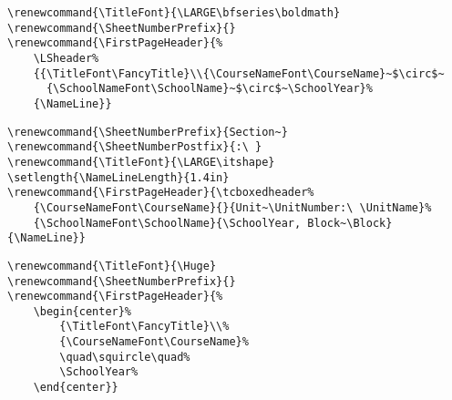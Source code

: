 \documentclass[12pt,twoside,parskip,notitle]{handout}
\begin{document}
\begingroup
\renewcommand{\TitleFont}{\LARGE\bfseries\boldmath}
\renewcommand{\SheetNumberPrefix}{}
\renewcommand{\FirstPageHeader}{%
	\LSheader%
	{{\TitleFont\FancyTitle}\\{\CourseNameFont\CourseName}~$\circ$~{\SchoolNameFont\SchoolName}~$\circ$~\SchoolYear}%
	{\NameLine}}
\maketitle
\singlespacing
\begin{verbatim}
\renewcommand{\TitleFont}{\LARGE\bfseries\boldmath}
\renewcommand{\SheetNumberPrefix}{}
\renewcommand{\FirstPageHeader}{%
    \LSheader%
    {{\TitleFont\FancyTitle}\\{\CourseNameFont\CourseName}~$\circ$~
      {\SchoolNameFont\SchoolName}~$\circ$~\SchoolYear}%
    {\NameLine}}
\end{verbatim}
\endgroup
\newpage

\begingroup
\renewcommand{\SheetNumberPrefix}{Section~}
\renewcommand{\SheetNumberPostfix}{:\ }
\renewcommand{\TitleFont}{\LARGE\itshape}
\setlength{\NameLineLength}{1.4in}
\renewcommand{\FirstPageHeader}{\tcboxedheader{\CourseNameFont\CourseName}{}{Unit~\UnitNumber:\ \UnitName}{\SchoolNameFont\SchoolName}{\SchoolYear, Block~\Block}{\NameSpace}}
\maketitle
\singlespacing
\begin{verbatim}
\renewcommand{\SheetNumberPrefix}{Section~}
\renewcommand{\SheetNumberPostfix}{:\ }
\renewcommand{\TitleFont}{\LARGE\itshape}
\setlength{\NameLineLength}{1.4in}
\renewcommand{\FirstPageHeader}{\tcboxedheader%
    {\CourseNameFont\CourseName}{}{Unit~\UnitNumber:\ \UnitName}%
    {\SchoolNameFont\SchoolName}{\SchoolYear, Block~\Block}{\NameLine}}
\end{verbatim}
\endgroup

\newpage

\begingroup
\renewcommand{\TitleFont}{\Huge}
\renewcommand{\SheetNumberPrefix}{}
\renewcommand{\FirstPageHeader}{%
	\begin{center}%
		{\TitleFont\FancyTitle}\\%
		{\CourseNameFont\CourseName}%
		\quad\squircle\quad%
		\SchoolYear%
	\end{center}}
\maketitle
\singlespacing
\begin{verbatim}
\renewcommand{\TitleFont}{\Huge}
\renewcommand{\SheetNumberPrefix}{}
\renewcommand{\FirstPageHeader}{%
    \begin{center}%
        {\TitleFont\FancyTitle}\\%
        {\CourseNameFont\CourseName}%
        \quad\squircle\quad%
        \SchoolYear%
    \end{center}}
\end{verbatim}
\endgroup
\end{document}
